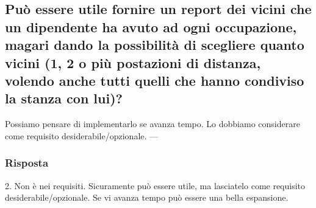 \subsection*{Può essere utile fornire un report dei vicini che un dipendente ha avuto ad ogni occupazione, magari dando la possibilità di scegliere quanto vicini (1, 2 o più postazioni di distanza, volendo anche tutti quelli che hanno condiviso la stanza con lui)?}
Possiamo pensare di implementarlo se avanza tempo. Lo dobbiamo considerare come requisito desiderabile/opzionale.
---
\subsubsection*{Risposta}
2. Non è nei requisiti. Sicuramente può essere utile, ma lasciatelo come requisito desiderabile/opzionale. Se vi avanza tempo può essere una bella espansione.


